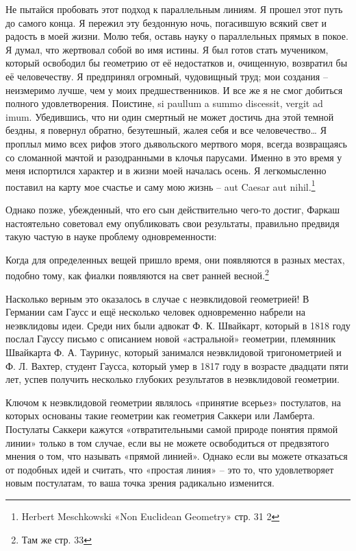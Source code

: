 \documentclass[../main.tex]{subfiles}
\begin{document}
Не пытайся пробовать этот подход к параллельным линиям. Я прошел этот путь до самого конца. Я пережил эту бездонную ночь, погасившую всякий свет и радость в моей жизни. Молю тебя, оставь науку о параллельных прямых в покое. Я думал, что жертвовал собой во имя истины. Я был готов стать мучеником, который освободил бы геометрию от её недостатков и, очищенную, возвратил бы её человечеству. Я предпринял огромный, чудовищный труд; мои создания \--- неизмеримо лучше, чем у моих предшественников. И все же я не смог добиться полного удовлетворения. Поистине, si paullum a summo discessit, vergit ad imum. Убедившись, что ни один смертный не может достичь дна этой темной бездны, я повернул обратно, безутешный, жалея себя и все человечество\ldots{} Я проплыл мимо всех рифов этого дьявольского мертвого моря, всегда возвращаясь со сломанной мачтой и разодранными в клочья парусами. Именно в это время у меня испортился характер и в жизни моей началась осень. Я легкомысленно поставил на карту мое счастье и саму мою жизнь \--- aut Caesar aut nihil.\footnote{Herbert Meschkowski «Non Euclidean Geometry» стр. 31 2}

Однако позже, убежденный, что его сын действительно чего-то достиг, Фаркаш настоятельно советовал ему опубликовать свои результаты, правильно предвидя такую частую в науке проблему одновременности:

Когда для определенных вещей пришло время, они появляются в разных местах, подобно тому, как фиалки появляются на свет ранней весной.\footnote{Там же стр. 33}

Насколько верным это оказалось в случае с неэвклидовой геометрией! В Германии сам Гаусс и ещё несколько человек одновременно набрели на неэвклидовы идеи. Среди них были адвокат Ф. К. Швайкарт, который в 1818 году послал Гауссу письмо с описанием новой «астральной» геометрии, племянник Швайкарта Ф. А. Тауринус, который занимался неэвклидовой тригонометрией и Ф. Л. Вахтер, студент Гаусса, который умер в 1817 году в возрасте двадцати пяти лет, успев получить несколько глубоких результатов в неэвклидовой геометрии.

Ключом к неэвклидовой геометрии являлось «принятие всерьез» постулатов, на которых основаны такие геометрии как геометрия Саккери или Ламберта. Постулаты Саккери кажутся «отвратительными самой природе понятия прямой линии» только в том случае, если вы не можете освободиться от предвзятого мнения о том, что называть «прямой линией». Однако если вы можете отказаться от подобных идей и считать, что «простая линия» \--- это то, что удовлетворяет новым постулатам, то ваша точка зрения радикально изменится.
\end{document}
